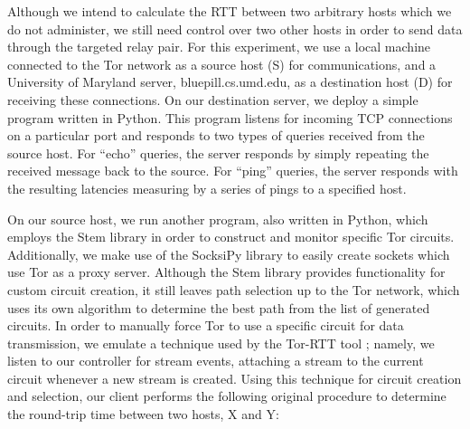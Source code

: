 \documentclass[twocolumn,11pt]{article}
\begin{document}
Although we intend to calculate the RTT between two arbitrary hosts which we do not administer, we still need control over two other hosts in order to send data through the targeted relay pair. For this experiment, we use a local machine connected to the Tor network as a source host (S) for communications, and a University of Maryland server, bluepill.cs.umd.edu, as a destination host (D) for receiving these connections. On our destination server, we deploy a simple program written in Python. This program listens for incoming TCP connections on a particular port and responds to two types of queries received from the source host. For ``echo'' queries, the server responds by simply repeating the received message back to the source. For ``ping'' queries, the server responds with the resulting latencies measuring by a series of pings to a specified host.
	
On our source host, we run another program, also written in Python, which employs the Stem library in order to construct and monitor specific Tor circuits. Additionally, we make use of the SocksiPy library to easily create sockets which use Tor as a proxy server. Although the Stem library provides functionality for custom circuit creation, it still leaves path selection up to the Tor network, which uses its own algorithm to determine the best path from the list of generated circuits. In order to manually force Tor to use a specific circuit for data transmission, we emulate a technique used by the Tor-RTT tool \cite{Tor_RTT}; namely, we listen to our controller for stream events, attaching a stream to the current circuit whenever a new stream is created. Using this technique for circuit creation and selection, our client performs the following original procedure to determine the round-trip time between two hosts, X and Y:
\end{document}
